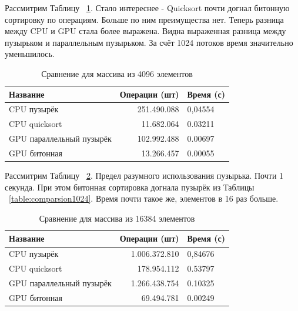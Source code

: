 \documentclass[a4paper,article]{article}
\begin{document}
    Рассмитрим Таблицу ~\ref{table:comparsion4096}. Стало интереснее - Quicksort почти догнал битонную сортировку по операциям. Больше по ним преимущества нет. Теперь разница между CPU и GPU стала более выражена. Видна выраженная разница между пузырьком и параллельным пузырьком. За счёт 1024 потоков время значительно уменьшилось.

    \begin{table}[h!]
        \centering
        \begin{tabular}{| l | r | l |}
            \hline
            {Название} & Операции (шт) & Время (с) \\
            \hline
            CPU пузырёк & 251.490.088 & 0,04554 \\
            \hline
            CPU quicksort & 11.682.064 & 0.03211 \\
            \hline
            GPU параллельный пузырёк & 102.992.488 & 0.00697 \\
            \hline
            GPU битонная & 13.266.457 & 0.00055 \\
            \hline
        \end{tabular}
        \caption{Сравнение для массива из 4096 элементов}
        \label{table:comparsion4096}
    \end{table}

    Рассмитрим Таблицу ~\ref{table:comparsion16384}. Предел разумного использования пузырька. Почти 1 секунда. При этом битонная сортировка догнала пузырёк из Таблицы ~\ref{table:comparsion1024}. Время почти такое же, элементов в 16 раз больше.

    \begin{table}[h!]
        \centering
        \begin{tabular}{| l | r | l |}
            \hline
            {Название} & Операции (шт) & Время (с) \\
            \hline
            CPU пузырёк & 1.006.372.810 & 0,84676 \\
            \hline
            CPU quicksort & 178.954.112 & 0.53797 \\
            \hline
            GPU параллельный пузырёк & 1.266.438.754 & 0.10325 \\
            \hline
            GPU битонная & 69.494.781 & 0.00249 \\
            \hline
        \end{tabular}
        \caption{Сравнение для массива из 16384 элементов}
        \label{table:comparsion16384}
    \end{table}
\end{document}

